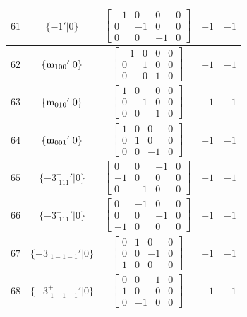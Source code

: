 \documentclass[fleqn,8pt]{jsarticle}
\begin{document}
\begin{longtable}{ccccc}
$ 61 $ & $ \{-1{}'|0\} $ & $ \begin{bmatrix} -1 & 0 & 0 & 0 \\ 0 & -1 & 0 & 0 \\ 0 & 0 & -1 & 0 \end{bmatrix} $ & $ -1 $ & $ -1 $ \\ \hline
$ 62 $ & $ \{{\rm m}_{100}{}'|0\} $ & $ \begin{bmatrix} -1 & 0 & 0 & 0 \\ 0 & 1 & 0 & 0 \\ 0 & 0 & 1 & 0 \end{bmatrix} $ & $ -1 $ & $ -1 $ \\ \hline
$ 63 $ & $ \{{\rm m}_{010}{}'|0\} $ & $ \begin{bmatrix} 1 & 0 & 0 & 0 \\ 0 & -1 & 0 & 0 \\ 0 & 0 & 1 & 0 \end{bmatrix} $ & $ -1 $ & $ -1 $ \\ \hline
$ 64 $ & $ \{{\rm m}_{001}{}'|0\} $ & $ \begin{bmatrix} 1 & 0 & 0 & 0 \\ 0 & 1 & 0 & 0 \\ 0 & 0 & -1 & 0 \end{bmatrix} $ & $ -1 $ & $ -1 $ \\ \hline
$ 65 $ & $ \{-3^{+}_{\,\,111}{}'|0\} $ & $ \begin{bmatrix} 0 & 0 & -1 & 0 \\ -1 & 0 & 0 & 0 \\ 0 & -1 & 0 & 0 \end{bmatrix} $ & $ -1 $ & $ -1 $ \\ \hline
$ 66 $ & $ \{-3^{-}_{\,\,111}{}'|0\} $ & $ \begin{bmatrix} 0 & -1 & 0 & 0 \\ 0 & 0 & -1 & 0 \\ -1 & 0 & 0 & 0 \end{bmatrix} $ & $ -1 $ & $ -1 $ \\ \hline
$ 67 $ & $ \{-3^{-}_{\,\,1-1-1}{}'|0\} $ & $ \begin{bmatrix} 0 & 1 & 0 & 0 \\ 0 & 0 & -1 & 0 \\ 1 & 0 & 0 & 0 \end{bmatrix} $ & $ -1 $ & $ -1 $ \\ \hline
$ 68 $ & $ \{-3^{+}_{\,\,1-1-1}{}'|0\} $ & $ \begin{bmatrix} 0 & 0 & 1 & 0 \\ 1 & 0 & 0 & 0 \\ 0 & -1 & 0 & 0 \end{bmatrix} $ & $ -1 $ & $ -1 $ \\ \hline

\end{longtable}
\end{document}
